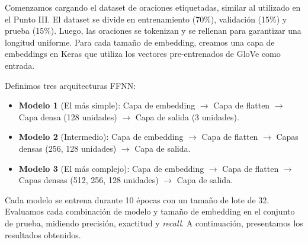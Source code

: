 \documentclass[11pt,english]{article}
\theoremstyle{plain}
\begin{document}
Comenzamos cargando el dataset de oraciones etiquetadas, similar al utilizado en el Punto III. El dataset se divide en entrenamiento (70\%), validación (15\%) y prueba (15\%). Luego, las oraciones se tokenizan y se rellenan para garantizar una longitud uniforme. Para cada tamaño de embedding, creamos una capa de embeddings en Keras que utiliza los vectores pre-entrenados de GloVe como entrada.

Definimos tres arquitecturas FFNN:

\begin{itemize}
    \item \textbf{Modelo 1} (El más simple): Capa de embedding $\rightarrow$ Capa de flatten $\rightarrow$ Capa densa (128 unidades) $\rightarrow$ Capa de salida (3 unidades).
    \item \textbf{Modelo 2} (Intermedio): Capa de embedding $\rightarrow$ Capa de flatten $\rightarrow$ Capas densas (256, 128 unidades) $\rightarrow$ Capa de salida.
    \item \textbf{Modelo 3} (El más complejo): Capa de embedding $\rightarrow$ Capa de flatten $\rightarrow$ Capas densas (512, 256, 128 unidades) $\rightarrow$ Capa de salida.
\end{itemize}

Cada modelo se entrena durante 10 épocas con un tamaño de lote de 32. Evaluamos cada combinación de modelo y tamaño de embedding en el conjunto de prueba, midiendo precisión, exactitud y \textit{recall}. A continuación, presentamos los resultados obtenidos.
\end{document}

